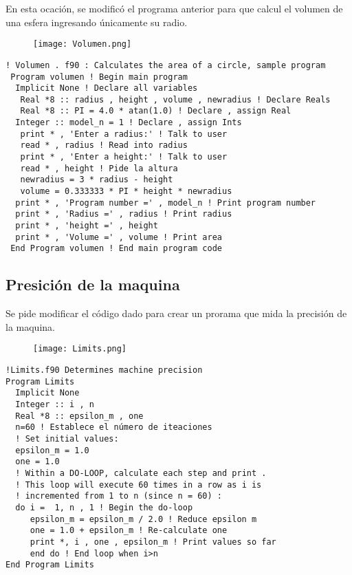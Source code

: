 \documentclass[12pt]{article}
\begin{document}
En esta ocación, se modificó el programa anterior para que calcul el volumen de una esfera ingresando únicamente su radio.

\begin{figure}[h]

\centering

\texttt{[image: Volumen.png]}

\end{figure}

\begin{verbatim}
! Volumen . f90 : Calculates the area of a circle, sample program
 Program volumen ! Begin main program
  Implicit None ! Declare all variables
   Real *8 :: radius , height , volume , newradius ! Declare Reals
   Real *8 :: PI = 4.0 * atan(1.0) ! Declare , assign Real
  Integer :: model_n = 1 ! Declare , assign Ints
   print * , 'Enter a radius:' ! Talk to user
   read * , radius ! Read into radius
   print * , 'Enter a height:' ! Talk to user
   read * , height ! Pide la altura
   newradius = 3 * radius - height
   volume = 0.333333 * PI * height * newradius 
  print * , 'Program number =' , model_n ! Print program number
  print * , 'Radius =' , radius ! Print radius
  print * , 'height =' , height 
  print * , 'Volume =' , volume ! Print area
 End Program volumen ! End main program code
\end{verbatim}

\subsection{Presición de la maquina}

Se pide modificar el código dado para crear un prorama que mida la precisión de la maquina.

\begin{figure}[h]

\centering

\texttt{[image: Limits.png]}

\end{figure}

\begin{verbatim}
!Limits.f90 Determines machine precision
Program Limits
  Implicit None
  Integer :: i , n
  Real *8 :: epsilon_m , one
  n=60 ! Establece el número de iteaciones
  ! Set initial values:
  epsilon_m = 1.0
  one = 1.0
  ! Within a DO-LOOP, calculate each step and print .
  ! This loop will execute 60 times in a row as i is
  ! incremented from 1 to n (since n = 60) :
  do i =  1, n , 1 ! Begin the do-loop
     epsilon_m = epsilon_m / 2.0 ! Reduce epsilon m
     one = 1.0 + epsilon_m ! Re-calculate one
     print *, i , one , epsilon_m ! Print values so far
     end do ! End loop when i>n
End Program Limits 
\end{verbatim}
\end{document}
